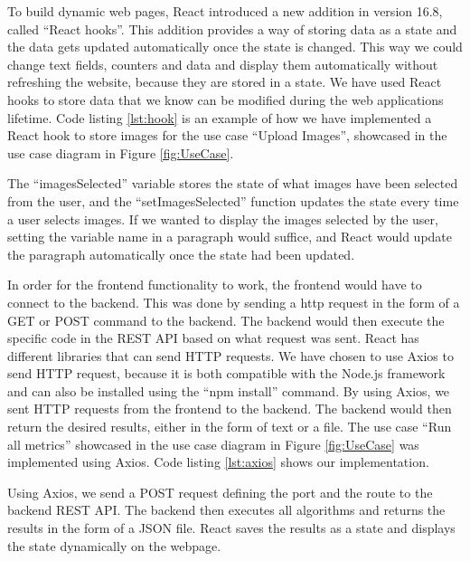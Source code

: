 To build dynamic web pages, React introduced a new addition in version 16.8, called ``React hooks''. This addition provides a way of storing data as a state and the data gets updated automatically once the state is changed. This way we could change text fields, counters and data and display them automatically without refreshing the website, because they are stored in a state. We have used React hooks to store data that we know can be modified during the web applications lifetime. Code listing \ref{lst:hook} is an example of how we have implemented a React hook to store images for the use case ``Upload Images'', showcased in the use case diagram in Figure \ref{fig:UseCase}.



The ``imagesSelected'' variable stores the state of what images have been selected from the user, and the ``setImagesSelected'' function updates the state every time a user selects images. If we wanted to display the images selected by the user, setting the variable name in a paragraph would suffice, and React would update the paragraph automatically once the state had been updated.

In order for the frontend functionality to work, the frontend would have to connect to the backend. This was done by sending a \acrshort{http} request in the form of a GET or POST command to the backend. The backend would then execute the specific code in the REST API based on what request was sent. React has different libraries that can send HTTP requests. We have chosen to use Axios to send HTTP request, because it is both compatible with the Node.js framework and can also be installed using the ``npm install'' command. By using Axios, we sent HTTP requests from the frontend to the backend. The backend would then return the desired results, either in the form of text or a file. The use case ``Run all metrics'' showcased in the use case diagram in Figure \ref{fig:UseCase} was implemented using Axios.  
Code listing \ref{lst:axios} shows our implementation. 
\newpage


Using Axios, we send a POST request defining the port and the route to the backend REST API. The backend then executes all algorithms and returns the results in the form of a JSON file. React saves the results as a state and displays the state dynamically on the webpage. 

